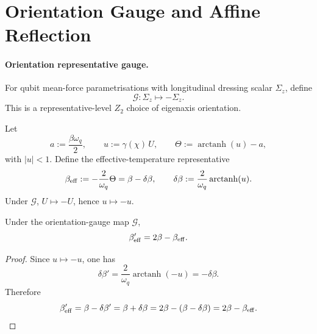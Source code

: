 \section{Orientation Gauge and Affine Reflection}
\label{sec:orientation_gauge}

\paragraph{Orientation representative gauge.}
For qubit mean-force parametrisations with longitudinal dressing scalar \(\Sigma_z\), define
\begin{equation}
  \mathcal{G}: \Sigma_z \mapsto -\Sigma_z.
\end{equation}
This is a representative-level \(Z_2\) choice of eigenaxis orientation.

\begin{definition}
\label{def:beta_eff}
Let
\begin{equation}
  a := \frac{\beta\omega_q}{2}, \qquad
  u := \gamma(\chi)\,U,
  \qquad \Theta := \operatorname{arctanh}(u)-a,
\end{equation}
with \(|u|<1\). Define the effective-temperature representative
\begin{equation}
  \beta_{\mathrm{eff}} := -\frac{2}{\omega_q}\Theta
  = \beta - \delta\beta,
  \qquad
  \delta\beta:=\frac{2}{\omega_q}\operatorname{arctanh}(u).
\end{equation}
Under \(\mathcal{G}\), \(U\mapsto -U\), hence \(u\mapsto -u\).
\end{definition}

\begin{lemma}
\label{lem:affine_reflection}
Under the orientation-gauge map \(\mathcal{G}\),
\begin{equation}
  \beta_{\mathrm{eff}}' = 2\beta - \beta_{\mathrm{eff}}.
\end{equation}
\end{lemma}
\begin{proof}
Since \(u\mapsto -u\), one has
\begin{equation}
  \delta\beta'=\frac{2}{\omega_q}\operatorname{arctanh}(-u)=-\delta\beta.
\end{equation}
Therefore
\begin{equation}
  \beta_{\mathrm{eff}}'=\beta-\delta\beta'
  =\beta+\delta\beta
  =2\beta-(\beta-\delta\beta)
  =2\beta-\beta_{\mathrm{eff}}.
\end{equation}
\end{proof}

